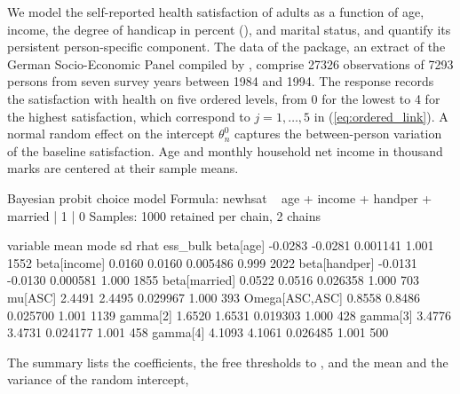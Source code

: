 \documentclass[article,shortnames]{jss}
\begin{document}
We model the self-reported health satisfaction of adults as a function of age,
income, the degree of handicap in percent (), and marital status,
and quantify its persistent person-specific component. The  data of
the  package, an extract of the German Socio-Economic Panel
compiled by \citet{Riphahn2003}, comprise 27326 observations of 7293 persons
from seven survey years between 1984 and 1994. The response 
records the satisfaction with health on five ordered levels, from 0 for the
lowest to 4 for the highest satisfaction, which correspond to $j = 1, \dots, 5$
in (\ref{eq:ordered_link}). A normal random effect on the intercept
$\theta_n^0$ captures the between-person variation of the baseline satisfaction.
Age and monthly household net income in thousand marks are centered at their
sample means.
%
\begin{Schunk}
\begin{Soutput}
Bayesian probit choice model
Formula: newhsat ~ age + income + handper + married | 1 | 0 
Samples: 1000 retained per chain, 2 chains

       variable    mean    mode       sd  rhat ess_bulk
      beta[age] -0.0283 -0.0281 0.001141 1.001     1552
   beta[income]  0.0160  0.0160 0.005486 0.999     2022
  beta[handper] -0.0131 -0.0130 0.000581 1.000     1855
  beta[married]  0.0522  0.0516 0.026358 1.000      703
        mu[ASC]  2.4491  2.4495 0.029967 1.000      393
 Omega[ASC,ASC]  0.8558  0.8486 0.025700 1.001     1139
       gamma[2]  1.6520  1.6531 0.019303 1.000      428
       gamma[3]  3.4776  3.4731 0.024177 1.001      458
       gamma[4]  4.1093  4.1061 0.026485 1.001      500
\end{Soutput}
\end{Schunk}
%
The summary lists the coefficients, the free thresholds  to
, and the mean and the variance of the random intercept,
\end{document}
